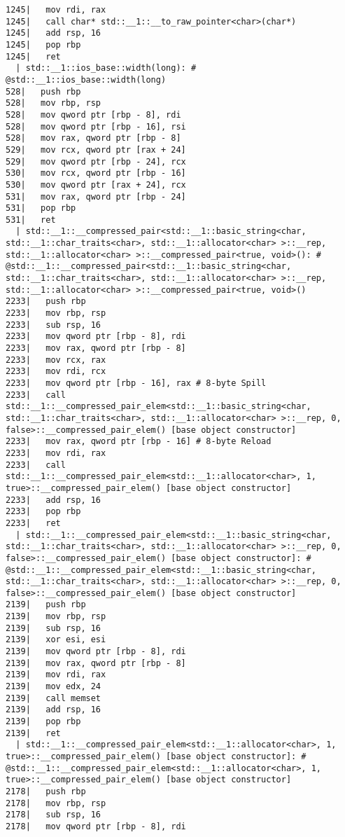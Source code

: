 \begin{lstlisting}[language={},numbers=none,title=\href{https://godbolt.org/z/hwKje8}{\texttt{godbolt.org/z/hwKje8}}]
1245|   mov rdi, rax
1245|   call char* std::__1::__to_raw_pointer<char>(char*)
1245|   add rsp, 16
1245|   pop rbp
1245|   ret
  | std::__1::ios_base::width(long): # @std::__1::ios_base::width(long)
528|   push rbp
528|   mov rbp, rsp
528|   mov qword ptr [rbp - 8], rdi
528|   mov qword ptr [rbp - 16], rsi
528|   mov rax, qword ptr [rbp - 8]
529|   mov rcx, qword ptr [rax + 24]
529|   mov qword ptr [rbp - 24], rcx
530|   mov rcx, qword ptr [rbp - 16]
530|   mov qword ptr [rax + 24], rcx
531|   mov rax, qword ptr [rbp - 24]
531|   pop rbp
531|   ret
  | std::__1::__compressed_pair<std::__1::basic_string<char, std::__1::char_traits<char>, std::__1::allocator<char> >::__rep, std::__1::allocator<char> >::__compressed_pair<true, void>(): # @std::__1::__compressed_pair<std::__1::basic_string<char, std::__1::char_traits<char>, std::__1::allocator<char> >::__rep, std::__1::allocator<char> >::__compressed_pair<true, void>()
2233|   push rbp
2233|   mov rbp, rsp
2233|   sub rsp, 16
2233|   mov qword ptr [rbp - 8], rdi
2233|   mov rax, qword ptr [rbp - 8]
2233|   mov rcx, rax
2233|   mov rdi, rcx
2233|   mov qword ptr [rbp - 16], rax # 8-byte Spill
2233|   call std::__1::__compressed_pair_elem<std::__1::basic_string<char, std::__1::char_traits<char>, std::__1::allocator<char> >::__rep, 0, false>::__compressed_pair_elem() [base object constructor]
2233|   mov rax, qword ptr [rbp - 16] # 8-byte Reload
2233|   mov rdi, rax
2233|   call std::__1::__compressed_pair_elem<std::__1::allocator<char>, 1, true>::__compressed_pair_elem() [base object constructor]
2233|   add rsp, 16
2233|   pop rbp
2233|   ret
  | std::__1::__compressed_pair_elem<std::__1::basic_string<char, std::__1::char_traits<char>, std::__1::allocator<char> >::__rep, 0, false>::__compressed_pair_elem() [base object constructor]: # @std::__1::__compressed_pair_elem<std::__1::basic_string<char, std::__1::char_traits<char>, std::__1::allocator<char> >::__rep, 0, false>::__compressed_pair_elem() [base object constructor]
2139|   push rbp
2139|   mov rbp, rsp
2139|   sub rsp, 16
2139|   xor esi, esi
2139|   mov qword ptr [rbp - 8], rdi
2139|   mov rax, qword ptr [rbp - 8]
2139|   mov rdi, rax
2139|   mov edx, 24
2139|   call memset
2139|   add rsp, 16
2139|   pop rbp
2139|   ret
  | std::__1::__compressed_pair_elem<std::__1::allocator<char>, 1, true>::__compressed_pair_elem() [base object constructor]: # @std::__1::__compressed_pair_elem<std::__1::allocator<char>, 1, true>::__compressed_pair_elem() [base object constructor]
2178|   push rbp
2178|   mov rbp, rsp
2178|   sub rsp, 16
2178|   mov qword ptr [rbp - 8], rdi

\end{lstlisting}
